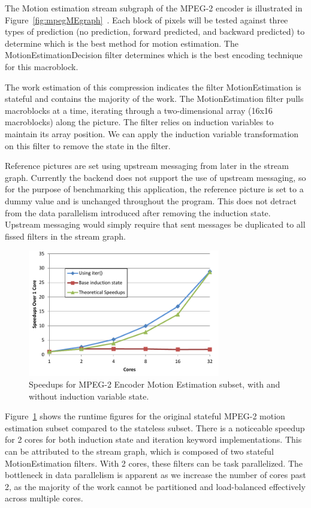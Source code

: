 The Motion estimation stream subgraph of the MPEG-2 encoder is illustrated in Figure~\ref{fig:mpegMEgraph}~\cite{drake-thesis}.  Each block of pixels will be tested against three types of prediction (no prediction, forward predicted, and backward predicted) to determine which is the best method for motion estimation.  The MotionEstimationDecision filter determines which is the best encoding technique for this macroblock.

The work estimation of this compression indicates the filter MotionEstimation is stateful and contains the majority of the work.  The MotionEstimation filter pulls macroblocks at a time, iterating through a two-dimensional array (16x16 macroblocks) along the picture.  The filter relies on induction variables to maintain its array position.  We can apply the induction variable transformation on this filter to remove the state in the filter.

Reference pictures are set using upstream messaging from later in the stream graph.  Currently the backend does not support the use of upstream messaging, so for the purpose of benchmarking this application, the reference picture is set to a dummy value and is unchanged throughout the program.  This does not detract from the data parallelism introduced after removing the induction state.  Upstream messaging would simply require that sent messages be duplicated to all fissed filters in the stream graph.

\begin{figure}[t]
\includegraphics[width=3.3in]{figures/mpeg-results.pdf}
\caption{Speedups for MPEG-2 Encoder Motion Estimation subset, with and without induction variable state.  \protect\label{fig:mpeg-results}}
\end{figure}

Figure~\ref{fig:mpeg-results} shows the runtime figures for the original stateful MPEG-2 motion estimation subset compared to the stateless subset.  There is a noticeable speedup for 2 cores for both induction state and iteration keyword implementations.  This can be attributed to the stream graph, which is composed of two stateful MotionEstimation filters.  With 2 cores, these filters can be task parallelized.  The bottleneck in data parallelism is apparent as we increase the number of cores past 2, as the majority of the work cannot be partitioned and load-balanced effectively across multiple cores.  

